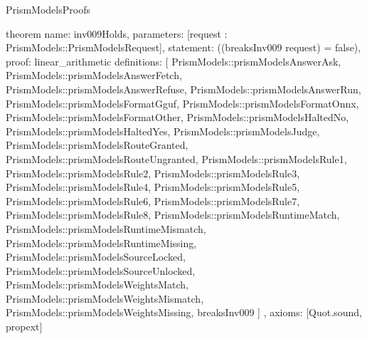 \begin{lexlean}{PrismModelsProofs}
\begin{semanticmodule}
theorem{
  name: inv009Holds,
  parameters: [request : PrismModels::PrismModelsRequest],
  statement: ((breaksInv009 request) = false),
  proof: linear_arithmetic{
    definitions: [
      PrismModels::prismModelsAnswerAsk,
      PrismModels::prismModelsAnswerFetch,
      PrismModels::prismModelsAnswerRefuse,
      PrismModels::prismModelsAnswerRun,
      PrismModels::prismModelsFormatGguf,
      PrismModels::prismModelsFormatOnnx,
      PrismModels::prismModelsFormatOther,
      PrismModels::prismModelsHaltedNo,
      PrismModels::prismModelsHaltedYes,
      PrismModels::prismModelsJudge,
      PrismModels::prismModelsRouteGranted,
      PrismModels::prismModelsRouteUngranted,
      PrismModels::prismModelsRule1,
      PrismModels::prismModelsRule2,
      PrismModels::prismModelsRule3,
      PrismModels::prismModelsRule4,
      PrismModels::prismModelsRule5,
      PrismModels::prismModelsRule6,
      PrismModels::prismModelsRule7,
      PrismModels::prismModelsRule8,
      PrismModels::prismModelsRuntimeMatch,
      PrismModels::prismModelsRuntimeMismatch,
      PrismModels::prismModelsRuntimeMissing,
      PrismModels::prismModelsSourceLocked,
      PrismModels::prismModelsSourceUnlocked,
      PrismModels::prismModelsWeightsMatch,
      PrismModels::prismModelsWeightsMismatch,
      PrismModels::prismModelsWeightsMissing,
      breaksInv009
    ]
  },
  axioms: [Quot.sound, propext]
}
\end{semanticmodule}
\end{lexlean}
